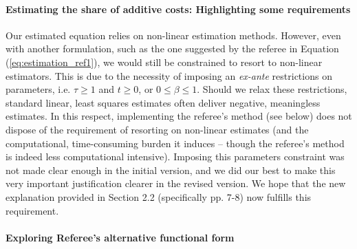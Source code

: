 \documentclass[a4paper,11pt]{article}
\begin{document}
\paragraph{Estimating the share of additive costs: Highlighting some requirements} Our estimated equation relies on non-linear estimation methods. However, even with another formulation, such as the one suggested by the referee in Equation (\ref{eq:estimation_ref1}), we would still be constrained to resort to non-linear estimators. This is due to the necessity of imposing an \textit{ex-ante} restrictions on parameters, i.e. $\tau \geq 1$ and $t \geq 0$, or $0 \leq  \beta \leq 1$. Should we relax these restrictions, standard linear, least squares estimates often deliver negative, meaningless estimates. In this respect, implementing the referee's method (see below) does not dispose of the requirement of resorting on non-linear estimates (and the computational, time-consuming burden it induces -- though the referee’s method is indeed less computational intensive). Imposing this parameters constraint was not made clear enough in the initial version, and we did our best to make this very important justification clearer in the revised version. We hope that the new explanation provided in Section 2.2 (specifically pp. 7-8) now fulfills this requirement. \smallskip



\paragraph{Exploring Referee's alternative functional form \label{subsec:functional_form}}
\end{document}
